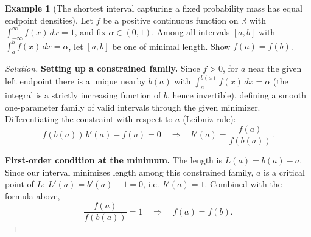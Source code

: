 \documentclass[11pt]{article}
\theoremstyle{definition}
\newtheorem{example}{Example}[section]
\newcommand{\R}{\mathbb{R}}
\begin{document}
\begin{example}[The shortest interval capturing a fixed probability mass has equal endpoint densities]
Let $f$ be a positive continuous function on $\R$ with $\int_{-\infty}^\infty f(x)\,dx=1$, and fix $\alpha\in(0,1)$. Among all intervals $[a,b]$ with $\int_a^bf(x)\,dx=\alpha$, let $[a,b]$ be one of minimal length. Show $f(a)=f(b)$.
\end{example}
\begin{proof}[Solution]
\textbf{Setting up a constrained family.} Since $f>0$, for $a$ near the given left endpoint there is a unique nearby $b(a)$ with $\int_a^{b(a)}f(x)\,dx=\alpha$ (the integral is a strictly increasing function of $b$, hence invertible), defining a smooth one-parameter family of valid intervals through the given minimizer. Differentiating the constraint with respect to $a$ (Leibniz rule):
\[
f(b(a))\,b'(a)-f(a)=0\quad\Longrightarrow\quad b'(a)=\frac{f(a)}{f(b(a))}.
\]

\textbf{First-order condition at the minimum.} The length is $L(a)=b(a)-a$. Since our interval minimizes length among this constrained family, $a$ is a critical point of $L$: $L'(a)=b'(a)-1=0$, i.e.\ $b'(a)=1$. Combined with the formula above,
\[
\frac{f(a)}{f(b(a))}=1\quad\Longrightarrow\quad\boxed{f(a)=f(b)}.
\]
\end{proof}
\end{document}
